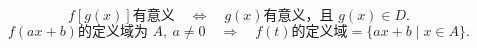 \[
 f[g(x)]\text{有意义}
 \quad\Longleftrightarrow\quad
 g(x)\text{有意义，且 }g(x)\in D.
\]
\[
 f(ax+b)\text{的定义域为 }A,\ a\ne 0
 \quad\Longrightarrow\quad
 f(t)\text{的定义域}=\{ax+b\mid x\in A\}.
\]
